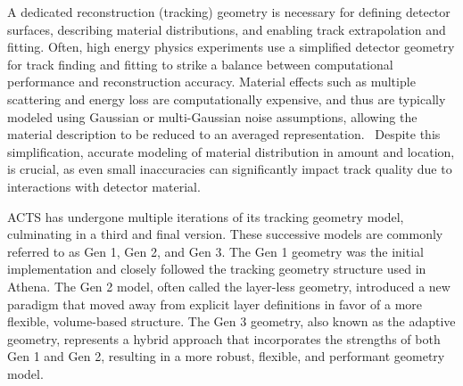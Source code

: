 
A dedicated reconstruction (tracking) geometry is necessary for defining detector surfaces, describing material distributions, and enabling track extrapolation and fitting. Often, high energy physics experiments use a simplified detector geometry for track finding and fitting to strike a balance between computational performance and reconstruction accuracy. Material effects such as multiple scattering and energy loss are computationally expensive, and thus are typically modeled using Gaussian or multi-Gaussian noise assumptions, allowing the material description to be reduced to an averaged representation.~\cite{Salzburger:2007rba} Despite this simplification, accurate modeling of material distribution in amount and location, is crucial, as even small inaccuracies can significantly impact track quality due to interactions with detector material.

ACTS has undergone multiple iterations of its tracking geometry model, culminating in a third and final version. These successive models are commonly referred to as Gen 1, Gen 2, and Gen 3. The Gen 1 geometry was the initial implementation and closely followed the tracking geometry structure used in Athena. The Gen 2 model, often called the layer-less geometry, introduced a new paradigm that moved away from explicit layer definitions in favor of a more flexible, volume-based structure. The Gen 3 geometry, also known as the adaptive geometry, represents a hybrid approach that incorporates the strengths of both Gen 1 and Gen 2, resulting in a more robust, flexible, and performant geometry model.

